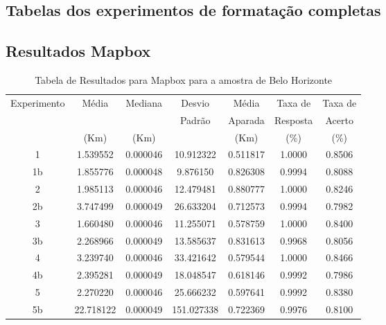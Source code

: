 
\begin{anexosenv}
\partanexos   %
\chapter{Tabelas dos experimentos de formatação completas}

\section{Resultados Mapbox}

\begin{table}[ht]
\centering
\begin{tabular}{|c|c|c|c|c|c|c|}
\hline
Experimento & Média & Mediana & Desvio & Média & Taxa de & Taxa de \\
 & & & Padrão & Aparada & Resposta & Acerto \\
 & (Km) & (Km) & & (Km) & (\%) & (\%) \\ \hline
1 & 1.539552 & 0.000046 & 10.912322 & 0.511817 & 1.0000 & 0.8506 \\ \hline
1b & 1.855776 & 0.000048 & 9.876150 & 0.826308 & 0.9994 & 0.8088 \\ \hline
2 & 1.985113 & 0.000046 & 12.479481 & 0.880777 & 1.0000 & 0.8246 \\ \hline
2b & 3.747499 & 0.000049 & 26.633204 & 0.712573 & 0.9994 & 0.7982 \\ \hline
3 & 1.660480 & 0.000046 & 11.255071 & 0.578759 & 1.0000 & 0.8400 \\ \hline
3b & 2.268966 & 0.000049 & 13.585637 & 0.831613 & 0.9968 & 0.8056 \\ \hline
4 & 3.239740 & 0.000046 & 33.421642 & 0.579544 & 1.0000 & 0.8466 \\ \hline
4b & 2.395281 & 0.000049 & 18.048547 & 0.618146 & 0.9992 & 0.7986 \\ \hline
5 & 2.270220 & 0.000046 & 25.666232 & 0.597641 & 0.9992 & 0.8380 \\ \hline
5b & 22.718122 & 0.000049 & 151.027338 & 0.722369 & 0.9976 & 0.8100 \\ \hline
\end{tabular}
\caption{Tabela de Resultados para Mapbox para a amostra de Belo Horizonte}
\label{tab:mapboxBH}
\end{table}


\end{anexosenv}
